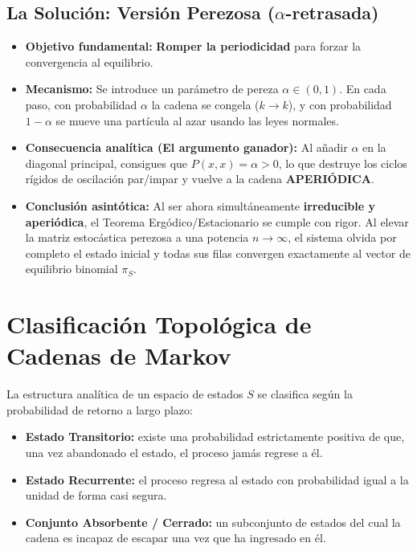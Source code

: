 \documentclass[10pt]{book}
\begin{document}
\subsection{La Solución: Versión Perezosa ($\alpha$-retrasada)}
\begin{itemize}
    \item \textbf{Objetivo fundamental:} \textbf{Romper la periodicidad} para forzar la convergencia al equilibrio.
    \item \textbf{Mecanismo:} Se introduce un parámetro de pereza $\alpha \in (0,1)$. En cada paso, con probabilidad $\alpha$ la cadena se congela ($k \to k$), y con probabilidad $1-\alpha$ se mueve una partícula al azar usando las leyes normales.
    \item \textbf{Consecuencia analítica (El argumento ganador):} Al añadir $\alpha$ en la diagonal principal, consigues que $P(x,x) = \alpha > 0$, lo que destruye los ciclos rígidos de oscilación par/impar y vuelve a la cadena \textbf{APERIÓDICA}.
    \item \textbf{Conclusión asintótica:} Al ser ahora simultáneamente \textbf{irreducible y aperiódica}, el Teorema Ergódico/Estacionario se cumple con rigor. Al elevar la matriz estocástica perezosa a una potencia $n \to \infty$, el sistema olvida por completo el estado inicial y todas sus filas convergen exactamente al vector de equilibrio binomial $\pi_S$.
\end{itemize}

\section{Clasificación Topológica de Cadenas de Markov}


La estructura analítica de un espacio de estados $S$ se clasifica según la probabilidad de retorno a largo plazo:
\begin{itemize}
    \item \textbf{Estado Transitorio:} existe una probabilidad estrictamente positiva de que, una vez abandonado el estado, el proceso jamás regrese a él.
    \item \textbf{Estado Recurrente:} el proceso regresa al estado con probabilidad igual a la unidad de forma casi segura.
    \item \textbf{Conjunto Absorbente / Cerrado:} un subconjunto de estados del cual la cadena es incapaz de escapar una vez que ha ingresado en él.
\end{itemize}
\end{document}
